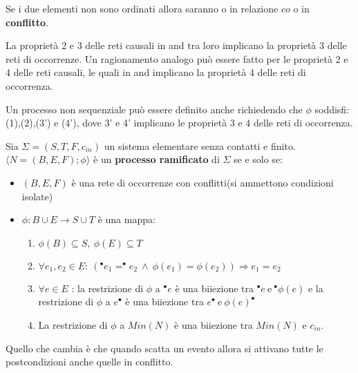 Se i due elementi non sono ordinati allora saranno o in relazione $co$ o in \textbf{conflitto}. 

\begin{nota}
    La proprietà 2 e 3 delle reti causali in and tra loro implicano la proprietà 3
    delle reti di occorrenze. Un ragionamento analogo può essere fatto per le proprietà
    2 e 4 delle reti causali, le quali in and implicano la proprietà 4 delle reti
    di occorrenza.
\end{nota}

\begin{nota}
    Un processo non sequenziale può essere definito anche richiedendo che $\phi$
    soddisfi: (1),(2),(3') e (4'), dove 3' e 4' implicano le proprietà 3 e 4
    delle reti di occorrenza.
\end{nota}
\begin{definizione}
    Sia $\Sigma = (S,T, F, c_{in})$ un sistema elementare senza contatti e finito.
    $\langle N = (B, E, F); \phi \rangle$ è un \textbf{processo ramificato} di $\Sigma$
    se e solo se:
    \begin{itemize}
        \item $(B, E, F)$ è una rete di occorrenze con conflitti(si ammettono condizioni isolate)
        \item $\phi: B \cup E \to S \cup T$ è una mappa:
              \begin{enumerate}
                  \item $\phi(B) \subseteq S, \ \phi(E) \subseteq T$
                  \item $\forall e_1, e_2 \in E: \ ( ^{\bullet} e_1 =  ^{\bullet}
                            e_2 \ \land \ \phi(e_1) = \phi(e_2)) \Rightarrow e_1 = e_2$
                  \item $\forall e \in E$ : la restrizione di $\phi$ a $^{\bullet} e$
                        è una biiezione tra $^{\bullet} e \ \text{e} \ ^{\bullet} \phi(e)$
                        e la restrizione di $\phi$ a $e^{\bullet}$ è una biiezione tra
                        $e^{\bullet} \ \text{e} \ \phi(e)^{\bullet}$
                  \item La restrizione di $\phi$ a $Min(N)$ è una biiezione tra
                        $Min(N)$ e $c_{in}$.
              \end{enumerate}
    \end{itemize}
\end{definizione}

Quello che cambia è che quando scatta un evento allora si attivano tutte le postcondizioni
anche quelle in conflitto.

